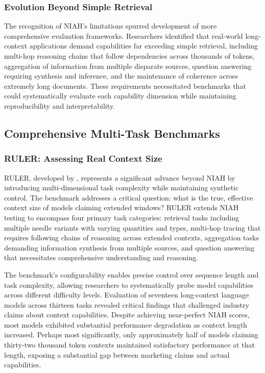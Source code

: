 \subsubsection{Evolution Beyond Simple Retrieval}

The recognition of NIAH's limitations spurred development of more comprehensive evaluation frameworks. Researchers identified that real-world long-context applications demand capabilities far exceeding simple retrieval, including multi-hop reasoning chains that follow dependencies across thousands of tokens, aggregation of information from multiple disparate sources, question answering requiring synthesis and inference, and the maintenance of coherence across extremely long documents. These requirements necessitated benchmarks that could systematically evaluate each capability dimension while maintaining reproducibility and interpretability.

\subsection{Comprehensive Multi-Task Benchmarks}

\subsubsection{RULER: Assessing Real Context Size}

RULER, developed by \citet{hsieh2024ruler}, represents a significant advance beyond NIAH by introducing multi-dimensional task complexity while maintaining synthetic control. The benchmark addresses a critical question: what is the true, effective context size of models claiming extended windows? RULER extends NIAH testing to encompass four primary task categories: retrieval tasks including multiple needle variants with varying quantities and types, multi-hop tracing that requires following chains of reasoning across extended contexts, aggregation tasks demanding information synthesis from multiple sources, and question answering that necessitates comprehensive understanding and reasoning.

The benchmark's configurability enables precise control over sequence length and task complexity, allowing researchers to systematically probe model capabilities across different difficulty levels. Evaluation of seventeen long-context language models across thirteen tasks revealed critical findings that challenged industry claims about context capabilities. Despite achieving near-perfect NIAH scores, most models exhibited substantial performance degradation as context length increased. Perhaps most significantly, only approximately half of models claiming thirty-two thousand token contexts maintained satisfactory performance at that length, exposing a substantial gap between marketing claims and actual capabilities.

